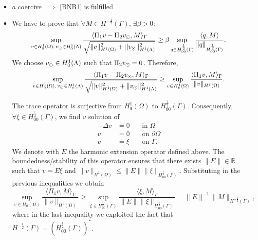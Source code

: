 \begin{itemize}
\item $a$ coercive $\implies$ \eqref{BNB1} is fulfilled

\item We have to prove that $\forall M \in H^{-\frac 12}(\Gamma),\, \exists \beta >0$:
\begin{equation*}
\sup _{v\in H^1_0(\Omega),\, v_{\odot} \in H^1_0(\Lambda)} \frac{ \langle \Pi_1 v  - \Pi_2 v_{\odot}, M \rangle_\Gamma}{\sqrt{\|v\|^2_{H^1(\Omega)}+\|v_{\odot} \|^2_{H^1(\Lambda)}}}\geq \beta \sup_{q\in H^{\frac 12}_{00}(\Gamma)}\frac{\langle q, M\rangle}{\|q\|_{H^{\frac 12}_{00}(\Gamma)}}.
\end{equation*}
We choose $v_{\odot} \in H^1_0(\Lambda)$ such that $\Pi _2v_{\odot} =0$. Therefore,
\begin{equation*}
\sup _{v\in H^1_0(\Omega),\, v_{\odot} \in H^1_0(\Lambda)} \frac{ \langle \Pi_1 v  - \Pi_2 v_{\odot}, M \rangle_\Gamma}{\sqrt{\|v\|^2_{H^1(\Omega)}+\|v_{\odot} \|^2_{H^1(\Lambda)}}} 
\geq \sup _{v\in H^1_0(\Omega)} \frac{ \langle \Pi_1 v, M \rangle_\Gamma}{\|v\|_{H^1(\Omega)}}.
\end{equation*}

The trace operator is surjective from $H^1_0(\Omega)$ to $H^{\frac12}_{00}(\Gamma)$. Consequently, $\forall \xi \in H^{\frac 12}_{00}(\Gamma)$, we find $v$ solution of
\begin{eqnarray*}
-\Delta v&=0 \quad &\text{in }\Omega\\
v&=0 &\text{on }\partial \Omega\\
v&=\xi &\text{on } \Gamma. 
\end{eqnarray*}
We denote with $E$ the harmonic extension operator defined above.
The boundedness/stability of this operator ensures that there exists $\| E \| \in \mathbb{R}$ such that
$v=E\xi $ and $\|v \|_{H^1(\Omega)}\leq \|E\| \|\xi \|_{H^{\frac 12}_{00}(\Gamma)}$. 
Substituting in the previous inequalities we obtain
\begin{equation}\label{infsup_traceop}
\sup _{v\in H^1_0(\Omega)} \frac{ \langle \Pi_1 v, M \rangle_\Gamma}{\|v\|_{H^1(\Omega)}}
\geq  \sup _{\xi \in H^{\frac 12}_{00}(\Gamma )} \frac{ \langle \xi , M \rangle_\Gamma}{\|E\| \|\xi\|_{H^{\frac 12}_{00}(\Gamma)}}
= \|E\|^{-1} \|M\|_{H^{-\frac 12}(\Gamma)},
\end{equation}
where in the last inequality we exploited the fact that $H^{-\frac 12}(\Gamma)=(H^{\frac 12 }_{00}(\Gamma))^*$.
\end{itemize}


